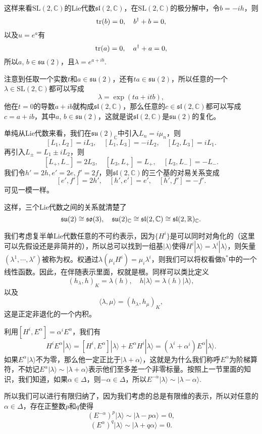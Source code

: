\documentclass[9pt]{extarticle}
\newcommand{\cc}{\mathbb{C}}
\begin{document}
这样来看$\mathrm{SL}(2,\cc)$的Lie代数$\mathfrak{sl}(2,\mathbb{C})$，在$\mathrm{SL}(2,\cc)$的极分解中，令$b=-ih$，则
\[
\operatorname{tr}(b)=0,\quad b^\dag+b=0,
\]
以及$u=e^a$有
\[
\operatorname{tr}(a)=0,\quad a^\dag+a=0,
\]
所以$a$, $b\in\mathfrak{su}(2)$，且$\lambda=e^{a+ib}$.

注意到任取一个实数$t$和$a\in\mathfrak{su}(2)$，还有$ta \in\mathfrak{su}(2)$，所以任意的一个$\lambda \in \mathrm{SL}(2,\cc)$都可以写成
\[
	\lambda=\exp(ta+itb),
\]
他在$t=0$的导数$a+ib$就构成$\mathfrak{sl}(2,\cc)$，那么任意的$c\in \mathfrak{sl}(2,\cc)$都可以写成$c=a+ib$，其中$a$, $b\in\mathfrak{su}(2)$，这就是说$\mathfrak{sl}(2,\cc)$是$\mathfrak{su}(2)$的复化。

单纯从Lie代数来看，我们在$\mathfrak{su}(2)_\cc$中引入$L_n=i\mu_n$，则
\[
	[L_1,L_2]=iL_3,\quad [L_1,L_3]=-iL_2,\quad [L_2,L_3]=iL_1.
\]
再引入$L_\pm=L_1\pm iL_2$，则
\[
	[L_+,L_-]=2L_3,\quad [L_3,L_+]=L_+,\quad [L_3,L_-]=-L_-.
\]
我们令$h'=2h,e'=2e,f'=2f$，则$\mathfrak{sl}(2,\cc)$的三个基的对易关系变成
\[
[e',f']=2h',\quad[h',e']=e',\quad[h',f']=-f'.
\]
可见一模一样。

这样，三个Lie代数之间的关系就清楚了
\[
	\mathfrak{su}(2)\cong\mathfrak{so}(3),\quad \mathfrak{su}(2)_\cc\cong \mathfrak{sl}(2,\mathbb{C}) \cong\mathfrak{sl}(2,\rr)_\cc.
\]

\para 我们考虑复半单Lie代数任意的不可约表示，因为$\{H^i\}$是可以同时对角化的（这里可以先假设还是非简并的），所以总可以找到一组基$|\lambda\rangle$使得$H^i|\lambda\rangle=\lambda^i|\lambda\rangle$，则矢量$(\lambda^1,\cdots,\lambda^r)$被称为权。权通过$\lambda(\mu_iH^i)=\mu_i\lambda^i$，则我们可以将权看做$\mathfrak{h}^*$中的一个线性函数。因此，在伴随表示里面，权就是根。同样可以类比定义
\[
	(h_\lambda,h)_K=\lambda(h),\quad h|\lambda\rangle=\lambda(h)|\lambda\rangle,
\]
以及
\[
	\langle \lambda,\mu\rangle=(h_\lambda,h_\mu)_K,
\]
这是正定非退化的一个内积。

利用$[H^i,E^\alpha]=\alpha^iE^\alpha$，我们有
\[
	H^iE^\alpha|\lambda\rangle=[H^i,E^\alpha]|\lambda\rangle+E^\alpha H^i|\lambda\rangle=(\lambda^i+\alpha^i)E^\alpha |\lambda\rangle.
\]
如果$E^\alpha |\lambda\rangle$不为零，那么他一定正比于$|\lambda+\alpha\rangle$，这就是为什么我们称呼$E^\alpha$为阶梯算符，不妨记$E^\alpha |\lambda\rangle\sim |\lambda+\alpha\rangle$表示他们至多差一个非零标量。按照上一节里面的知识，我们知道，如果$\alpha\in \Delta$，则$-\alpha\in\Delta$，所以$E^{-\alpha} |\lambda\rangle\sim |\lambda-\alpha\rangle$.

所以我们可以进行有限归纳了，因为我们考虑的总是有限维的表示，所以对任意的$\alpha\in \Delta$，存在正整数$p$和$q$使得
\[
	(E^{-\alpha})^p |\lambda\rangle\sim |\lambda-p\alpha\rangle =0,
\]
\[
	(E^{\alpha})^q |\lambda\rangle\sim |\lambda+q\alpha\rangle =0.
\]
\end{document}
